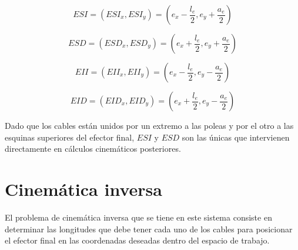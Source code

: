 \begin{myequation}[h]
\begin{equation}
ESI = (ESI_x, ESI_y) = (e_x - \frac{l_e}{2}, e_y + \frac{a_e}{2})
\end{equation}
\caption[Posición de la esquina superior izquierda del efector final.]{Posición de la esquina superior izquierda del efector final.}
\end{myequation}

\begin{myequation}[h]
\begin{equation}
ESD = (ESD_x, ESD_y) = (e_x + \frac{l_e}{2}, e_y + \frac{a_e}{2})
\end{equation}
\caption[Posición de la esquina superior derecha del efector final.]{Posición de la esquina superior derecha del efector final.}
\end{myequation}

\newpage

\begin{myequation}[h]
\begin{equation}
EII = (EII_x, EII_y) = (e_x - \frac{l_e}{2}, e_y - \frac{a_e}{2})
\end{equation}
\caption[Posición de la esquina inferior izquierda del efector final.]{Posición de la esquina inferior izquierda del efector final.}
\end{myequation}

\begin{myequation}[h]
\begin{equation}
EID = (EID_x, EID_y) = (e_x + \frac{l_e}{2}, e_y - \frac{a_e}{2})
\end{equation}
\caption[Posición de la esquina inferior derecha del efector final.]{Posición de la esquina inferior derecha del efector final.}
\end{myequation}

Dado que los cables están unidos por un extremo a las poleas y por el otro a las esquinas superiores del efector final, $ESI$ y $ESD$ son las únicas que intervienen directamente en cálculos cinemáticos posteriores.

\section{Cinemática inversa}
\label{sec:segundaseccion}

El problema de cinemática inversa que se tiene en este sistema consiste en determinar las longitudes que debe tener cada uno de los cables para posicionar el efector final en las coordenadas deseadas dentro del espacio de trabajo.

